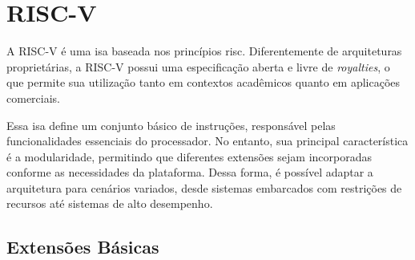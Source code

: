 \section{RISC-V}

A RISC-V é uma \gls{isa} baseada nos princípios \gls{risc}. Diferentemente de arquiteturas proprietárias,
a RISC-V possui uma especificação aberta e livre de \textit{royalties}, o que permite sua utilização tanto em contextos acadêmicos quanto em aplicações
comerciais.

Essa \gls{isa} define um conjunto básico de instruções, responsável pelas funcionalidades essenciais do processador. No entanto, sua
principal característica é a modularidade, permitindo que diferentes extensões sejam incorporadas conforme as necessidades da plataforma.
Dessa forma, é possível adaptar a arquitetura para cenários variados, desde sistemas embarcados com restrições de recursos até sistemas de
alto desempenho.

\subsection{Extensões Básicas}

